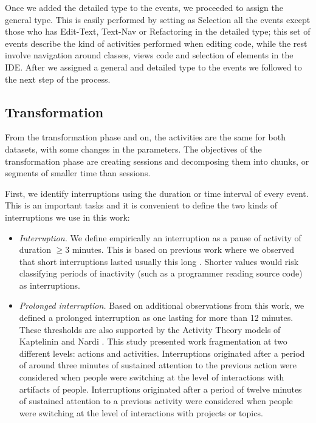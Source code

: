 Once we added the detailed type to the events, we proceeded to assign the general type. This is easily performed by setting as Selection all the events except those who has Edit-Text, Text-Nav or Refactoring in the detailed type; this set of events describe the kind of activities performed when editing code, while the rest involve navigation around classes, views code and selection of elements in the IDE. After we assigned a general and detailed type to the events we followed to the next step of the process.

\subsection{Transformation}
From the transformation phase and on, the activities are the same for both datasets, with some changes in the parameters. The objectives of the transformation phase are creating sessions and decomposing them into chunks, or segments of smaller time than sessions.

First, we identify interruptions using the duration or time interval of every event. This is an important tasks and it is convenient to define the two kinds of interruptions we use in this work:

\begin{itemize}
	\item \textit{Interruption.} We define empirically an interruption as a pause of activity of duration $\geq 3$ minutes. This is based on previous work where we observed that short interruptions lasted usually this long \cite{GM04}. Shorter values would risk classifying periods of inactivity (such as a programmer reading source code) as interruptions.
	
	\item \textit{Prolonged interruption.} Based on additional observations from this work, we defined a prolonged interruption as one lasting for more than 12 minutes. These thresholds are also supported by the Activity Theory models of Kaptelinin and Nardi \cite{KaptelininN07}. This study presented work fragmentation at two different levels: actions and activities. Interruptions originated after a period of around three minutes of sustained attention to the previous action were considered when people were switching at the level of interactions with artifacts of people. Interruptions originated after a period of twelve minutes of sustained attention to a previous activity were considered when people were switching at the level of interactions with projects or topics.  
\end{itemize}

